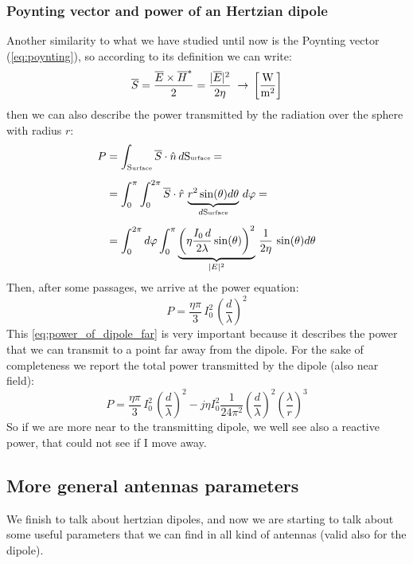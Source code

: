 \subsubsection*{Poynting vector and power of an Hertzian dipole}
Another similarity to what we have studied until now is the Poynting vector (\cref{eq:poynting}), so according to its definition we can write:
\begin{equation}
        \overline{S}=\frac{\overline{E}\times\overline{H}^*}{2}=\frac{|\overline{E}|^2}{2\eta}\;\rightarrow\,\left[\si{\frac{\watt}{\metre^2}}\right]
\end{equation}
then we can also describe the power transmitted by the radiation over the sphere with radius $r$:
\begin{align}
    \begin{split}
        P&=\int_{\text{S\tiny{urface}}}\overline{S}\cdot\hat{n}\, d\text{S\tiny{urface}}=\\[5pt]
        &=\int_0^\pi\int_0^{2\pi}\overline{S}\cdot\hat{r}\,\underbrace{r^2\sin(\theta)d\theta}_{d\text{S\tiny{urface}}}\,d\varphi=\\[5pt]
        &=\int_0^{2\pi}d\varphi\int_0^\pi \underbrace{\left(\eta\frac{I_0\,d}{2\lambda}\sin(\theta)\right)^2}_{|E|^2}\,\frac{1}{2\eta}\,\sin(\theta)d\theta
    \end{split}
\end{align}
Then, after some passages, we arrive at the power equation:
\begin{equation}\label{eq:power_of_dipole_far}
    P=\frac{\eta \pi}{3}\,I_0^2\,\left(\frac{d}{\lambda}\right)^2
\end{equation}
This \cref{eq:power_of_dipole_far} is very important because it describes the power that we can transmit to a point far away from the dipole. For the sake of completeness we report the total power transmitted by the dipole (also near field):
\begin{equation}
    P=\frac{\eta \pi}{3}\,I_0^2\,\left(\frac{d}{\lambda}\right)^2-j\eta I_0^2\frac{1}{24\pi^2}\left(\frac{d}{\lambda}\right)^2\left(\frac{\lambda}{r}\right)^3
\end{equation}
So if we are more near to the transmitting dipole, we well see also a reactive power, that could not see if I move away.
\subsection*{More general antennas parameters}
We finish to talk about hertzian dipoles, and now we are starting to talk about some useful parameters that we can find in all kind of antennas (valid also for the dipole).
